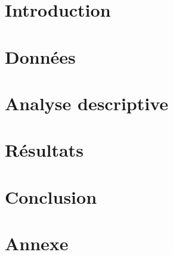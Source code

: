 \documentclass[10pt]{article} %
\begin{document}
\section{Introduction}


\section{Données}


\section{Analyse descriptive}


\section{Résultats}


\vspace{-0.3cm}
\section{Conclusion}
\vspace{-0.2cm}



\nocite{*}




\section{Annexe}

\end{document}
